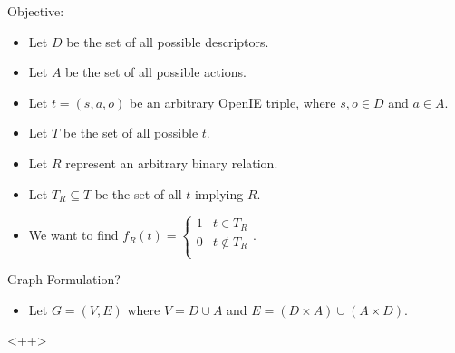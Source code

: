 \documentclass[a4paper]{article}
\begin{document}
Objective:
\begin{itemize}
    \item Let $D$ be the set of all possible descriptors.
    \item Let $A$ be the set of all possible actions.
    \item Let $t = (s, a, o)$ be an arbitrary OpenIE triple, where $s, o \in D$
        and $a \in A$.
    \item Let $T$ be the set of all possible $t$.
    \item Let $R$ represent an arbitrary binary relation.
    \item Let $T_R \subseteq T$ be the set of all $t$ implying $R$.
    \item We want to find $f_R(t) = 
        \begin{cases}
            1 & t \in T_R\\
            0 & t \notin T_R\\
        \end{cases}
        $.
\end{itemize}

Graph Formulation?
\begin{itemize}
    \item Let $G = (V, E)$ where $V = D \cup A$ and $E = (D \times A) 
        \cup (A \times D)$.
\end{itemize}<++>
\end{document}
